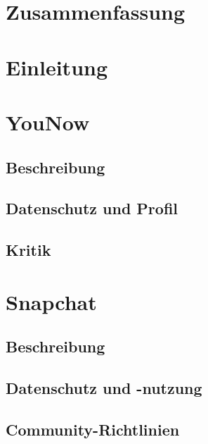 \documentclass[a4paper,12pt]{scrartcl}
\begin{document}


\tableofcontents %
\pagebreak

\section*{Zusammenfassung}


\newpage

\section{Einleitung}



\section{YouNow}
\subsection{Beschreibung}

\subsection{Datenschutz und Profil}

\subsection{Kritik}



\section{Snapchat}
\subsection{Beschreibung}

\subsection{Datenschutz und -nutzung}

\subsection{Community-Richtlinien}

\end{document}
